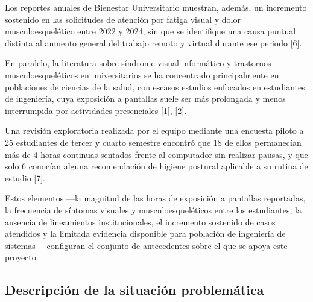 Los reportes anuales de Bienestar Universitario muestran, además, un incremento sostenido
en las solicitudes de atención por fatiga visual y dolor musculoesquelético entre 2022 y
2024, sin que se identifique una causa puntual distinta al aumento general del trabajo
remoto y virtual durante ese periodo [6].
 
En paralelo, la literatura sobre síndrome visual informático y trastornos
musculoesqueléticos en universitarios se ha concentrado principalmente en poblaciones de
ciencias de la salud, con escasos estudios enfocados en estudiantes de ingeniería, cuya
exposición a pantallas suele ser más prolongada y menos interrumpida por actividades
presenciales [1], [2].
 
Una revisión exploratoria realizada por el equipo mediante una encuesta piloto a 25
estudiantes de tercer y cuarto semestre encontró que 18 de ellos permanecían más de 4
horas continuas sentados frente al computador sin realizar pausas, y que solo 6 conocían
alguna recomendación de higiene postural aplicable a su rutina de estudio [7].
 
Estos elementos —la magnitud de las horas de exposición a pantallas reportadas, la
frecuencia de síntomas visuales y musculoesqueléticos entre los estudiantes, la ausencia
de lineamientos institucionales, el incremento sostenido de casos atendidos y la limitada
evidencia disponible para población de ingeniería de sistemas— configuran el conjunto de
antecedentes sobre el que se apoya este proyecto.

\subsection{Descripción de la situación problemática}

